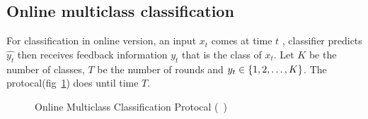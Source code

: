 \justify


\subsection{Online multiclass classification}
For classification in online version, an input $x_t$ comes at time $t$
, classifier predicts $\hat{y_t}$ then receives feedback information $y_t$ that is the class of $x_t$.
Let $K$ be the number of classes, $T$ be the number of rounds and $y_t\in \{1,2,\dots,K\}$.
The protocal(fig~\ref{fig:alg-online}) does until time $T$.

\begin{figure}[hbt!]
  \begin{algorithm}[H]
    \SetAlgoLined
    \DontPrintSemicolon
      \end{algorithm}
  \centering
  \caption{Online Multiclass Classification Protocal (~\cite{CrammerS2003-ultraconservative})}
  \label{fig:alg-online}
\end{figure}



